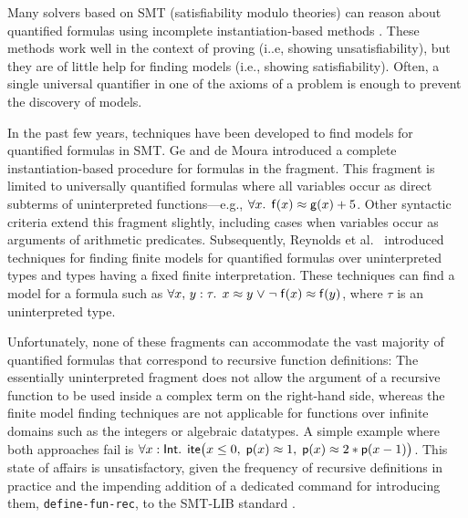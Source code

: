 Many solvers based on SMT (satisfiability modulo theories) can reason about
quantified formulas using incomplete instantiation-based methods
\cite{MouraBjoerner07,ReynoldsTinelliMoura14}.
These methods work well in the context of proving (i..e, showing
unsatisfiability), but they are of little help for finding models (i.e.,
showing satisfiability). Often, a single universal quantifier in one of the
axioms of a problem is enough to prevent the discovery of models.

In the past few years, techniques have been developed to find models for
quantified formulas in SMT.
Ge and de Moura \cite{GeDeM-CAV-09} introduced a complete instantiation-based
procedure for formulas in the  fragment.
This fragment is limited to universally quantified formulas where all
variables occur as direct subterms of uninterpreted
functions---e.g., $\forall x%
.\;\, \con{f}( x )
\teq \con{g}( x ) + 5$.
Other syntactic criteria extend
this fragment slightly, including cases when variables occur as arguments of
arithmetic predicates. Subsequently, Reynolds et al.\
\cite{ReyEtAl-1-RR-13,reynolds-et-al-2013} introduced techniques for finding finite
models for quantified
formulas over uninterpreted types and types having a fixed finite
interpretation. %
These techniques can
find a model for a formula such as $\forall x,\, y : \tau.\;\, x \teq
y \vee \allowbreak \neg \con{f}( x ) \teq \con{f}( y )$, where $\tau$ is an uninterpreted type.

Unfortunately, none of these fragments can accommodate the vast majority of
quantified formulas that correspond to recursive function definitions: The
essentially uninterpreted fragment does not allow the argument of a
recursive function to be used inside a complex term on the right-hand side,
whereas the finite model finding techniques %
are not applicable for functions over infinite domains such as the integers or
algebraic datatypes. A simple example where both approaches fail is
$\forall x : {\mathsf{Int}}.\;\, \mathsf{ite}\bigl(
x \leq 0,\allowbreak\; \mathsf{p}( x ) \approx 1,\allowbreak\; \mathsf{p}( x ) \approx 2 * \mathsf{p}( x - 1 ) \bigr)$.
This state of affairs is unsatisfactory, given the frequency of
recursive definitions in practice and the impending addition of a dedicated
command for introducing them, \texttt{define-fun-rec}, to the SMT-LIB standard \cite{smtlib25}.

